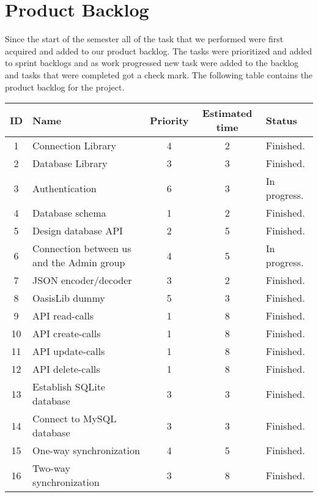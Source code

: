 \section{Product Backlog}
Since the start of the semester all of the task that we performed were first acquired and added to our product backlog. The tasks were prioritized and added to sprint backlogs and as work progressed new task were added to the backlog and tasks that were completed got a check mark. The following table contains the product backlog for the project.

\begin{center}
	\begin{tabular}{| c | l | c | c | l |}
	\hline
	\textbf{ID} 	& \textbf{Name} 										& \textbf{Priority} 	& \textbf{Estimated time} 	& \textbf{Status} 			\\ 	\hline
	1 	& Connection Library 						& 4 		& 2 				& Finished. 		\\	\hline
	2 	& Database Library 							& 3 		& 3 				& Finished. 		\\	\hline
	3 	& Authentication 							& 6 		& 3 				& In progress. 		\\ 	\hline
	4 	& Database schema 							& 1 		& 2 				& Finished. 		\\	\hline
	5 	& Design database API 						& 2 		& 5 				& Finished. 		\\	\hline
	6 	& Connection between us and the Admin group & 4 		& 5 				& In progress. 		\\ 	\hline
	7 	& JSON encoder/decoder 						& 3 		& 2 				& Finished. 		\\	\hline
	8 	& OasisLib dummy							& 5 		& 3 				& Finished. 		\\	\hline
	9 	& API read-calls 							& 1 		& 8 				& Finished. 		\\ 	\hline
	10 	& API create-calls 							& 1 		& 8 				& Finished. 		\\	\hline
	11 	& API update-calls 							& 1 		& 8 				& Finished. 		\\	\hline
	12	& API delete-calls							& 1 		& 8 				& Finished. 		\\ 	\hline
	13 	& Establish SQLite database 				& 3 		& 3 				& Finished. 		\\	\hline
	14	& Connect to MySQL database 				& 3 		& 3 				& Finished. 		\\	\hline
	15	& One-way synchronization					& 4 		& 5 				& Finished. 		\\ 	\hline
	16	& Two-way synchronization					& 3 		& 8 				& Finished. 		\\	\hline

\end{tabular}
\end{center}
